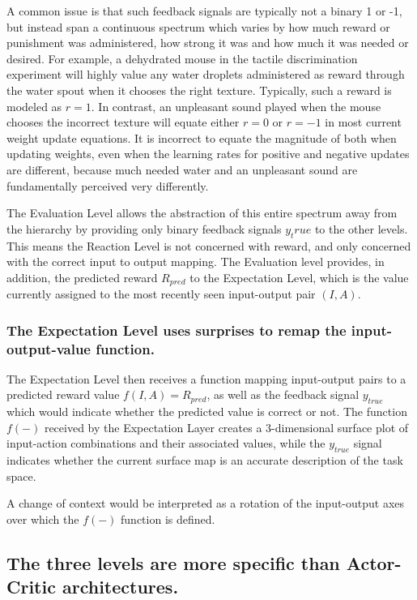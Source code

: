 \documentclass[11pt]{article}
\begin{document}
A common issue is that such feedback signals are typically not a binary 1 or -1, but instead span a continuous spectrum which varies by how much reward or punishment was administered, how strong it was and how much it was needed or desired.  For example, a dehydrated mouse in the tactile discrimination experiment will highly value any water droplets administered as reward through the water spout when it chooses the right texture.  Typically, such a reward is modeled as $r = 1$.  In contrast, an unpleasant sound played when the mouse chooses the incorrect texture will equate either $r = 0$ or $r = -1$ in most current weight update equations.  It is incorrect to equate the magnitude of both when updating weights, even when the learning rates for positive and negative updates are different, because much needed water and an unpleasant sound are fundamentally perceived very differently.

The Evaluation Level allows the abstraction of this entire spectrum away from the hierarchy by providing only binary feedback signals $y_true$ to the other levels.  This means the Reaction Level is not concerned with reward, and only concerned with the correct input to output mapping.  The Evaluation level provides, in addition, the predicted reward $R_{pred}$ to the Expectation Level, which is the value currently assigned to the most recently seen input-output pair $(I, A)$.

\subsubsection{The Expectation Level uses surprises to remap the input-output-value function.}
The Expectation Level then receives a function mapping input-output pairs to a predicted reward value $f(I, A) = R_{pred}$, as well as the feedback signal $y_{true}$ which would indicate whether the predicted value is correct or not.  The function $f(-)$ received by the Expectation Layer creates a 3-dimensional surface plot of input-action combinations and their associated values, while the $y_{true}$ signal indicates whether the current surface map is an accurate description of the task space.

A change of context would be interpreted as a rotation of the input-output axes over which the $f(-)$ function is defined. 

\subsection{The three levels are more specific than Actor-Critic architectures.}
\end{document}
